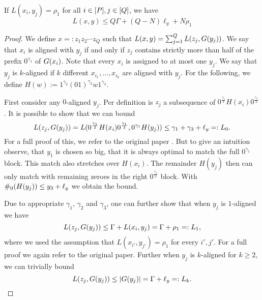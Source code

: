 \begin{lemma}
\label{lem:1-2vs1:non-ortho-upper-bound}
If $L(x_i, y_j) = \rho_1$ for all $i \in [P], j \in [Q]$, we have
\[ 
L(x,y) \leq Q\Gamma + (Q-N)\ell_y + N\rho_1
\]
\end{lemma}


\begin{proof}
%
We define $x =: z_1z_2 \cdots z_Q$ such that $L(x,y) = \sum_{j=1}^Q L(z_j, G(y_j))$.
We say that $x_i$ is aligned with $y_j$ if and only if $z_j$ contains strictly more than half of the prefix $0^{\gamma_1}$ of $G(x_i)$.
Note that every $x_i$ is assigned to at most one $y_j$.
We say that $y_j$ is $k$-aligned if $k$ different $x_{i_1}, \ldots, x_{i_k}$ are aligned with $y_j$.
For the following, we define $H(w) := 1^{\gamma_2}(01)^{\gamma_3}w1^{\gamma_3}$.

First consider any $0$-aligned $y_j$.
Per definition is $z_j$ a subsequence of $0^{\frac{\gamma_1}{2}}H(x_i)0^{\frac{\gamma_1}{2}}$.
It is possible to show that we can bound
\[
L(z_j, G(y_j)) = L(0^{\frac{\gamma_1}{2}}H(x_i)0^{\frac{\gamma_1}{2}}, 0^{\gamma_1}H(y_j)) \leq \gamma_1 + \gamma_3 + \ell_y =: L_0.
\]
For a full proof of this, we refer to the original paper \cite[Lemma 9.6\footnote{Lemma 9.6 combines this and the following lemma in this summary. The proof of the claim is in the proof for the second inequality of Lemma 9.6.}]{Bringman.2018}.
But to give an intuition observe, that $y_1$ is chosen so big, that it is always optimal to match the full $0^{\gamma_1}$ block.
This match also stretches over $H(x_i)$.
The remainder $H(y_j)$ then can only match with remaining zeroes in the right $0^{\frac{\gamma_1}{2}}$ block.
With $\#_{0}(H(y_j)) \leq y_3 + \ell_y$ we obtain the bound.


Due to appropriate $\gamma_1$, $\gamma_2$ and $\gamma_3$, one can further show that when $y_j$ is $1$-aligned we have
\[
	L(z_j, G(y_j)) \leq \Gamma + L(x_i, y_j) = \Gamma + \rho_1 =: L_1,
\]
where we used the assumption that $L(x_{i'}, y_{j'}) = \rho_1$ for every $i', j'$.
For a full proof we again refer to the original paper.
%
Further when $y_j$ is $k$-aligned for $k \geq 2$, we can trivially bound 
\[
L(z_j, G(y_j)) \leq |G(y_j)| = \Gamma + \ell_y =: L_k.
\]


\end{proof}
